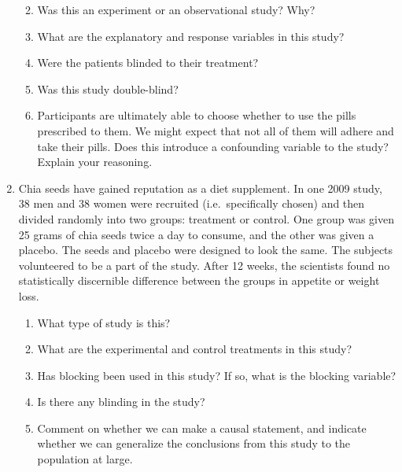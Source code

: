 \documentclass[
  letterpaper,
  DIV=11,
  numbers=noendperiod]{scrartcl}
\providecommand{\tightlist}{%
  \setlength{\itemsep}{0pt}\setlength{\parskip}{0pt}}\usepackage{longtable,booktabs,array}
\begin{document}
\begin{enumerate}
  \begin{enumerate}
  \def\labelenumii{\alph{enumii}.}
  \tightlist
  \item
    Was this an experiment or an observational study? Why?
  \item
    What are the explanatory and response variables in this study?
  \item
    Were the patients blinded to their treatment?
  \item
    Was this study double-blind?
  \item
    Participants are ultimately able to choose whether to use the pills
    prescribed to them. We might expect that not all of them will adhere
    and take their pills. Does this introduce a confounding variable to
    the study? Explain your reasoning.
  \end{enumerate}
\item
  Chia seeds have gained reputation as a diet supplement. In one 2009
  study, 38 men and 38 women were recruited (i.e.~specifically chosen)
  and then divided randomly into two groups: treatment or control. One
  group was given 25 grams of chia seeds twice a day to consume, and the
  other was given a placebo. The seeds and placebo were designed to look
  the same. The subjects volunteered to be a part of the study. After 12
  weeks, the scientists found no statistically discernible difference
  between the groups in appetite or weight loss.

  \begin{enumerate}
  \def\labelenumii{\alph{enumii}.}
  \item
    What type of study is this?
  \item
    What are the experimental and control treatments in this study?
  \item
    Has blocking been used in this study? If so, what is the blocking
    variable?
  \item
    Is there any blinding in the study?
  \item
    Comment on whether we can make a causal statement, and indicate
    whether we can generalize the conclusions from this study to the
    population at large.
  \end{enumerate}
\end{enumerate}
\end{document}
